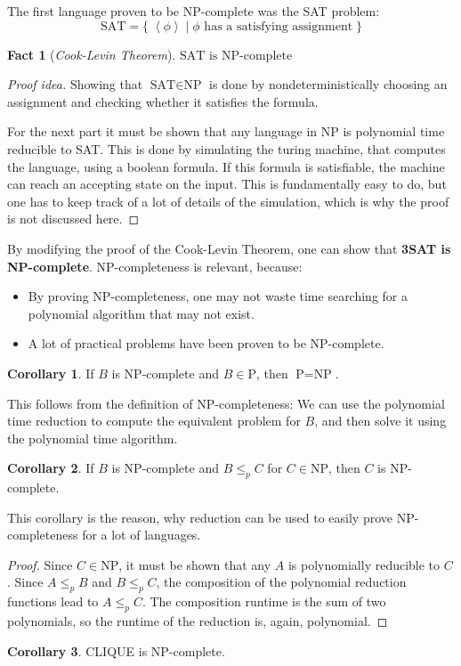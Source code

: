 \documentclass[10pt,fleqn]{article}
\theoremstyle{definition}
\newtheorem{corollary}{Corollary}
\newtheorem{fact}{Fact}
\theoremstyle{remark}
\newcommand{\pclass}{\text{P}}
\newcommand{\npclass}{\text{NP}}
\newcommand{\satprob}{\text{SAT}}
\newcommand{\lpp}{\left \langle}
\newcommand{\rpp}{\right \rangle}
\newcommand{\enc}[1]{\lpp #1 \rpp}
\renewcommand{\qedsymbol}{\(\blacksquare\)}
\begin{document}
The first language proven to be NP-complete was the SAT problem:
\[
    \satprob = \{ \;\enc{\phi} \mid \phi \text{ has a satisfying assignment} \; \}
\]
\begin{fact}[\emph{Cook-Levin Theorem}]
    \(\satprob \text{ is NP-complete}\)
\end{fact}
\begin{proof}[Proof idea] Showing that \(\satprob \in \npclass\) is done by nondeterministically choosing an assignment and checking whether it satisfies the formula.

    For the next part it must be shown that any language in NP is polynomial time reducible to SAT. This is done by simulating the turing machine, that computes the language, using a boolean formula. If this formula is satisfiable, the machine can reach an accepting state on the input. This is fundamentally easy to do, but one has to keep track of a lot of details of the simulation, which is why the proof is not discussed here.
    \renewcommand{\qedsymbol}{}
\end{proof}

By modifying the proof of the Cook-Levin Theorem, one can show that \textbf{3SAT is NP-complete}. NP-completeness is relevant, because:
\begin{itemize}

    \item By proving NP-completeness, one may not waste time searching for a polynomial algorithm that may not exist.

    \item A lot of practical problems have been proven to be NP-complete.

\end{itemize}

\begin{corollary}
    If \(B\) is NP-complete and \(B \in \pclass\), then \(\pclass=\npclass\).
\end{corollary}
This follows from the definition of NP-completeness: We can use the polynomial time reduction to compute the equivalent problem for \(B\), and then solve it using the polynomial time algorithm.
\begin{corollary}
    If \(B\) is NP-complete and \(B \leq_p C\) for \(C \in \npclass\), then \(C\) is NP-complete.
\end{corollary}
This corollary is the reason, why reduction can be used to easily prove NP-completeness for a lot of languages.
\begin{proof}
    Since \(C \in \npclass\), it must be shown that any \(A\) is polynomially reducible to \(C\). Since \(A \leq_p B\) and \(B \leq_p C\), the composition of the polynomial reduction functions lead to \(A \leq_p C\). The composition runtime is the sum of two polynomials, so the runtime of the reduction is, again, polynomial.
\end{proof}
\begin{corollary}
    CLIQUE is NP-complete.
\end{corollary}
\end{document}

